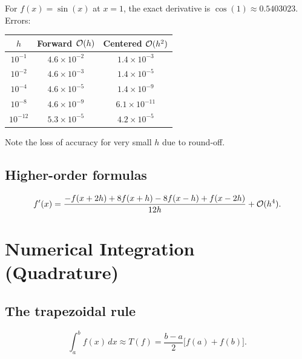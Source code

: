 \begin{example}
\label{ex:fd-comparison}
For $f(x) = \sin(x)$ at $x = 1$, the exact derivative is $\cos(1) \approx 0.5403023$. Errors:
\begin{center}
\begin{tabular}{ccc}
    \toprule
    $h$ & Forward $\mathcal{O}(h)$ & Centered $\mathcal{O}(h^2)$ \\
    \midrule
    $10^{-1}$ & $4.6 \times 10^{-2}$ & $1.4 \times 10^{-3}$ \\
    $10^{-2}$ & $4.6 \times 10^{-3}$ & $1.4 \times 10^{-5}$ \\
    $10^{-4}$ & $4.6 \times 10^{-5}$ & $1.4 \times 10^{-9}$ \\
    $10^{-8}$ & $4.6 \times 10^{-9}$ & $6.1 \times 10^{-11}$ \\
    $10^{-12}$& $5.3 \times 10^{-5}$ & $4.2 \times 10^{-5}$ \\
    \bottomrule
\end{tabular}
\end{center}
Note the loss of accuracy for very small $h$ due to round-off.
\end{example}

\subsection{Higher-order formulas}

\begin{proposition}
\label{prop:fd4}
\[
    f'(x) = \frac{-f(x+2h) + 8f(x+h) - 8f(x-h) + f(x-2h)}{12h} + \mathcal{O}(h^4).
\]
\end{proposition}

\section{Numerical Integration (Quadrature)}

\subsection{The trapezoidal rule}

\begin{definition}
\label{def:trap-simple}
\[
    \int_a^b f(x)\,dx \approx T(f) = \frac{b-a}{2}\bigl[f(a) + f(b)\bigr].
\]
\end{definition}

